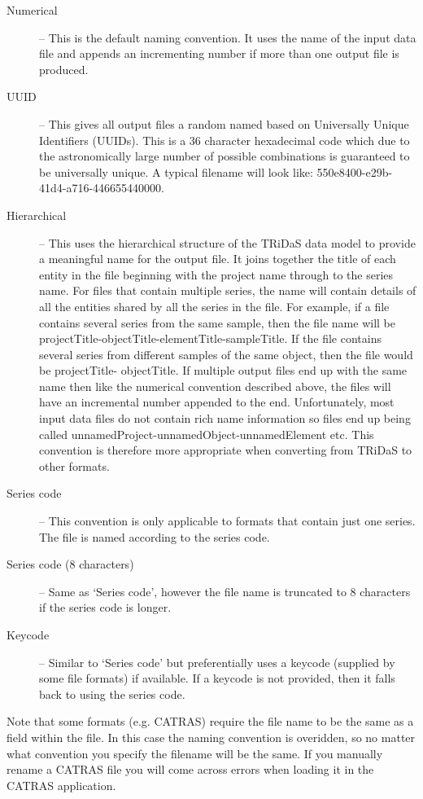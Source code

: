 \begin{description}
 \item[Numerical] -- This is the default naming convention. It uses the name of the input data file and
appends an incrementing number if more than one output file is produced.
 \item[UUID] -- This gives all output files a random named based on Universally Unique Identifiers
(UUIDs). This is a 36 character hexadecimal code which due to the astronomically
large number of possible combinations is guaranteed to be universally unique. A
typical filename will look like: 550e8400-e29b-41d4-a716-446655440000.
 \item[Hierarchical] -- This uses the hierarchical structure of the TRiDaS data model to provide a meaningful
name for the output file. It joins together the title of each entity in the file beginning
with the project name through to the series name. For files that contain multiple series,
the name will contain details of all the entities shared by all the series in the file. For
example, if a file contains several series from the same sample, then the file name
will be projectTitle-objectTitle-elementTitle-sampleTitle. If the file contains several
series from different samples of the same object, then the file would be projectTitle-
objectTitle. If multiple output files end up with the same name then like the numerical
convention described above, the files will have an incremental number appended to
the end. Unfortunately, most input data files do not contain rich name information
so files end up being called unnamedProject-unnamedObject-unnamedElement etc.
This convention is therefore more appropriate when converting from TRiDaS to other
formats.
\item[Series code] -- This convention is only applicable to formats that contain just one series.  The file is named according to the series code.
\item[Series code (8 characters)] -- Same as `Series code', however the file name is truncated to 8 characters if the series code is longer.  
\item[Keycode] -- Similar to `Series code' but preferentially uses a keycode (supplied by some file formats) if available.  If a keycode is not provided, then it falls back to using the series code.
 \end{description}

Note that some formats (e.g. CATRAS) require the file name to be the same as a field within the file.  In this case the naming convention is overidden, so no matter what convention you specify the filename will be the same.  If you manually rename a CATRAS file you will come across errors when loading it in the CATRAS application.

